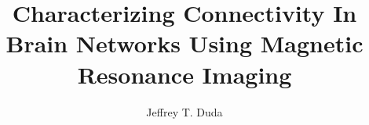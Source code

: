 \documentclass[pdftex]{upenndiss}
\title{Characterizing Connectivity In Brain Networks Using Magnetic Resonance Imaging}
\author{Jeffrey T. Duda}
\begin{document}
\FrontMatter*
\listoftables
\listoffigures
\MainMatter

 


%
%




%
%
%
%

%
%
%
%
%
\appendix





\end{document}
